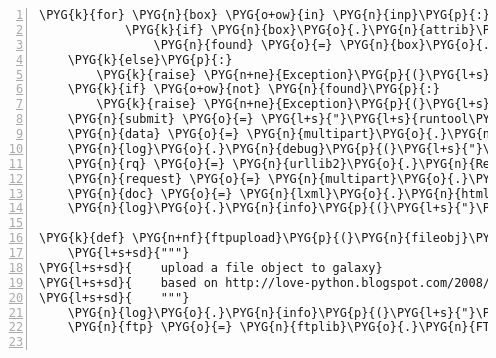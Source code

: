 \begin{Verbatim}[commandchars=\\\{\},numbers=left,firstnumber=1,stepnumber=5]
        \PYG{k}{for} \PYG{n}{box} \PYG{o+ow}{in} \PYG{n}{inp}\PYG{p}{:}
            \PYG{k}{if} \PYG{n}{box}\PYG{o}{.}\PYG{n}{attrib}\PYG{p}{[}\PYG{l+s}{'}\PYG{l+s}{value}\PYG{l+s}{'}\PYG{p}{]} \PYG{o}{==} \PYG{n}{filename}\PYG{p}{:}
                \PYG{n}{found} \PYG{o}{=} \PYG{n}{box}\PYG{o}{.}\PYG{n}{checked} \PYG{o}{=} \PYG{n+nb+bp}{True}
    \PYG{k}{else}\PYG{p}{:}
        \PYG{k}{raise} \PYG{n+ne}{Exception}\PYG{p}{(}\PYG{l+s}{"}\PYG{l+s}{unexpected html element: }\PYG{l+s+si}{\PYGZpc{}s}\PYG{l+s}{"} \PYG{o}{\PYGZpc{}} \PYG{n}{inp}\PYG{p}{)}
    \PYG{k}{if} \PYG{o+ow}{not} \PYG{n}{found}\PYG{p}{:}
        \PYG{k}{raise} \PYG{n+ne}{Exception}\PYG{p}{(}\PYG{l+s}{"}\PYG{l+s}{file not available for import: }\PYG{l+s+si}{\PYGZpc{}s}\PYG{l+s}{"} \PYG{o}{\PYGZpc{}} \PYG{n}{filename}\PYG{p}{)}
    \PYG{n}{submit} \PYG{o}{=} \PYG{l+s}{"}\PYG{l+s}{runtool\PYGZus{}btn}\PYG{l+s}{"}\PYG{p}{,} \PYG{n}{form}\PYG{o}{.}\PYG{n}{fields}\PYG{p}{[}\PYG{l+s}{"}\PYG{l+s}{runtool\PYGZus{}btn}\PYG{l+s}{"}\PYG{p}{]}
    \PYG{n}{data} \PYG{o}{=} \PYG{n}{multipart}\PYG{o}{.}\PYG{n}{urlencode}\PYG{p}{(}\PYG{n}{form}\PYG{o}{.}\PYG{n}{form\PYGZus{}values}\PYG{p}{(}\PYG{p}{)} \PYG{o}{+} \PYG{p}{[}\PYG{n}{submit}\PYG{p}{]}\PYG{p}{)}
    \PYG{n}{log}\PYG{o}{.}\PYG{n}{debug}\PYG{p}{(}\PYG{l+s}{"}\PYG{l+s}{posting upload form: }\PYG{l+s+si}{\PYGZpc{}s}\PYG{l+s}{"} \PYG{o}{\PYGZpc{}} \PYG{n}{form}\PYG{o}{.}\PYG{n}{action}\PYG{p}{)}
    \PYG{n}{rq} \PYG{o}{=} \PYG{n}{urllib2}\PYG{o}{.}\PYG{n}{Request}\PYG{p}{(}\PYG{n}{form}\PYG{o}{.}\PYG{n}{action}\PYG{p}{,} \PYG{n}{data}\PYG{p}{,} \PYG{n}{headers}\PYG{o}{=}\PYG{n}{rq\PYGZus{}headers}\PYG{p}{)}
    \PYG{n}{request} \PYG{o}{=} \PYG{n}{multipart}\PYG{o}{.}\PYG{n}{urlopen}\PYG{p}{(}\PYG{n}{rq}\PYG{p}{)}
    \PYG{n}{doc} \PYG{o}{=} \PYG{n}{lxml}\PYG{o}{.}\PYG{n}{html}\PYG{o}{.}\PYG{n}{parse}\PYG{p}{(}\PYG{n}{request}\PYG{p}{)}\PYG{o}{.}\PYG{n}{getroot}\PYG{p}{(}\PYG{p}{)}
    \PYG{n}{log}\PYG{o}{.}\PYG{n}{info}\PYG{p}{(}\PYG{l+s}{"}\PYG{l+s}{Success!}\PYG{l+s}{"}\PYG{p}{)}

\PYG{k}{def} \PYG{n+nf}{ftpupload}\PYG{p}{(}\PYG{n}{fileobj}\PYG{p}{,} \PYG{n}{filename}\PYG{p}{)}\PYG{p}{:}
    \PYG{l+s+sd}{"""}
\PYG{l+s+sd}{    upload a file object to galaxy}
\PYG{l+s+sd}{    based on http://love-python.blogspot.com/2008/02/ftp-file-upload.html}
\PYG{l+s+sd}{    """}
    \PYG{n}{log}\PYG{o}{.}\PYG{n}{info}\PYG{p}{(}\PYG{l+s}{"}\PYG{l+s}{uploading file to ftp server}\PYG{l+s}{"}\PYG{p}{)}
    \PYG{n}{ftp} \PYG{o}{=} \PYG{n}{ftplib}\PYG{o}{.}\PYG{n}{FTP}\PYG{p}{(}\PYG{n}{hostname}\PYG{p}{,} \PYG{n}{email}\PYG{p}{,} \PYG{n}{password}\PYG{p}{)}


\end{Verbatim}
